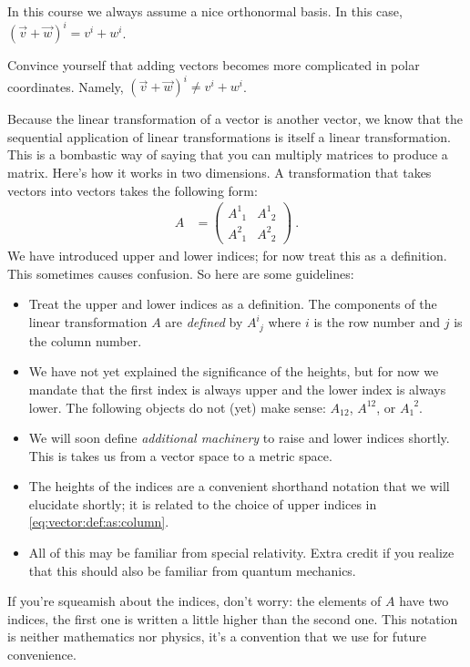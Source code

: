 In this course we always assume a nice orthonormal basis. In this case, $(\vec{v} + \vec{w})^i = v^i + w^i$.
\begin{exercise}
Convince yourself that adding vectors becomes more complicated in polar coordinates. Namely, $(\vec{v} + \vec{w})^i \neq v^i + w^i$.
\end{exercise}

Because the linear transformation of a vector is another vector, we know that the sequential application of linear transformations is itself a linear transformation. This is a bombastic way of saying that you can multiply matrices to produce a matrix.  Here’s how it works in two dimensions. A transformation that takes vectors into vectors takes the following form:
\begin{align}
  A &= 
  \begin{pmatrix}
   A^{1}_{\phantom{1}1} & A^{1}_{\phantom{1}2}
   \\
   A^{2}_{\phantom{1}1} & A^{2}_{\phantom{1}2}
  \end{pmatrix} \ .
\end{align}
We have introduced upper and lower indices; for now treat this as a definition. This sometimes causes confusion. So here are some guidelines:
\begin{itemize}
	\item Treat the upper and lower indices as a definition. The components of the linear transformation $A$ are \emph{defined} by $A^i_{\phantom{i}j}$ where $i$ is the row number and $j$ is the column number. 
	\item We have not yet explained the significance of the heights, but for now we mandate that the first index is always upper and the lower index is always lower. The following objects do not (yet) make sense:  $A_{12}$, $A^{12}$, or $A_{1}^{\phantom{1}2}$.
	\item We will soon define \emph{additional machinery} to raise and lower indices shortly. This is takes us from a vector space to a metric space.
	\item The heights of the indices are a convenient shorthand notation that we will elucidate shortly; it is related to the choice of upper indices in \eqref{eq:vector:def:as:column}.
	\item All of this may be familiar from special relativity. Extra credit if you realize that this should also be familiar from quantum mechanics.
\end{itemize}
If you’re squeamish about the indices, don’t worry: the elements of $A$ have two indices, the first one is written a little higher than the second one. This notation is neither mathematics nor physics, it’s a convention that we use for future convenience.

